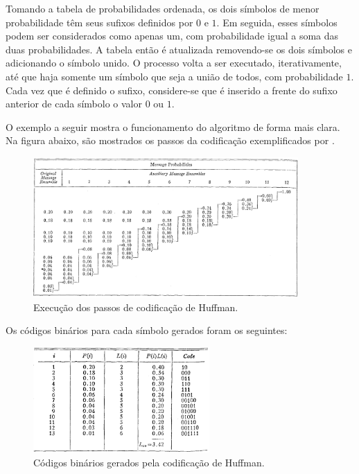\documentclass[cic,tc]{iiufrgs}
\begin{document}
Tomando a tabela de probabilidades ordenada, os dois símbolos de menor probabilidade 
têm seus sufixos definidos por $0$ e $1$.
Em seguida, esses símbolos podem ser considerados como apenas um, com probabilidade igual 
a soma das duas probabilidades. 
A tabela então é atualizada removendo-se os dois símbolos e adicionando o símbolo unido. 
O processo volta a ser executado, iterativamente, até que haja somente um símbolo que seja 
a união de todos, com probabilidade $1$.
Cada vez que é definido o sufixo, considere-se que é inserido a frente do sufixo anterior 
de cada símbolo o valor $0$ ou $1$.

O exemplo a seguir mostra o funcionamento do algoritmo de forma mais clara.
Na figura abaixo, são mostrados os passos da codificação exemplificados por 
\citet{HuffmanCoding}.

\begin{figure}[H]
    \caption{Execução dos passos de codificação de Huffman.}
    \begin{center}
        \includegraphics[width=0.9\textwidth]{img/huffmanprocess.png}
    \end{center}
\end{figure}

Os códigos binários para cada símbolo gerados foram os seguintes:
\begin{figure}[H]
    \caption{Códigos binários gerados pela codificação de Huffman.}
    \begin{center}
        \includegraphics[width=0.6\textwidth]{img/huffmantable.png}
    \end{center}
\end{figure}
\end{document}
